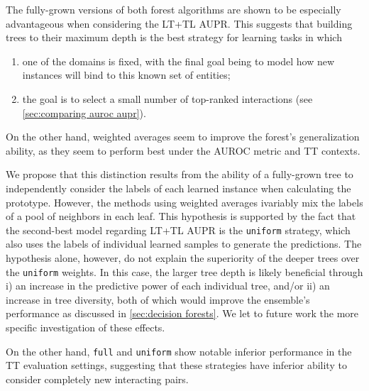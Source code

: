 The fully-grown versions of both forest algorithms are shown to be especially advantageous when considering the LT+TL AUPR. This suggests that building trees to their maximum depth is the best strategy for learning tasks in which
%
\begin{enumerate}
    \item one of the domains is fixed, with the final goal being to model how new instances will bind to this known set of entities;
    \item the goal is to select a small number of top-ranked interactions (see \autoref{sec:comparing auroc aupr}).
\end{enumerate}
%
%
On the other hand, weighted averages seem to improve the forest's generalization ability, as they seem to perform best under the AUROC metric and TT contexts.

We propose that this distinction results from the ability of a fully-grown tree to independently consider the labels of each learned instance when calculating the prototype.
However, the methods using weighted averages ivariably mix the labels of a pool of neighbors in each leaf.
This hypothesis is supported by the fact that the second-best model regarding LT+TL AUPR is the \texttt{uniform} strategy, which also uses the labels of individual learned samples to generate the predictions.
%
The hypothesis alone, however, do not explain the superiority of the deeper trees over the \texttt{uniform} weights. In this case, the larger tree depth is likely beneficial through i) an increase in the predictive power of each individual tree, and/or ii) an increase in tree diversity, both of which would improve the ensemble's performance as discussed in \autoref{sec:decision forests}. We let to future work the more specific investigation of these effects.

On the other hand, \texttt{full} and \texttt{uniform} show notable inferior performance in the TT evaluation settings, suggesting that these strategies have inferior ability to consider completely new interacting pairs.


